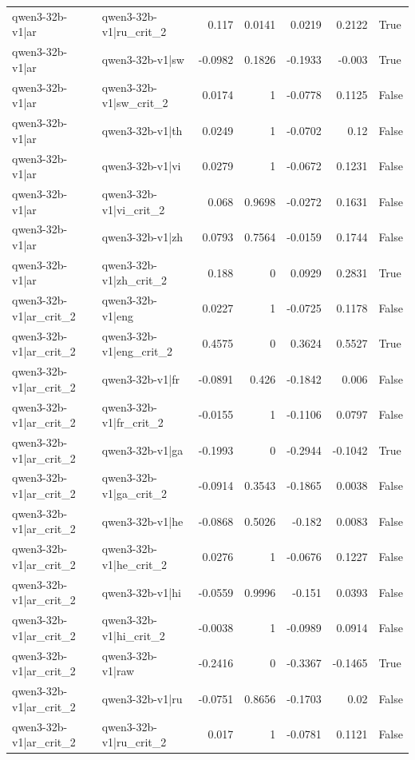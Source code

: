 \begin{table}
\begin{tabular}{l l r r r r l}
qwen3-32b-v1|ar & qwen3-32b-v1|ru_crit_2 & 0.117 & 0.0141 & 0.0219 & 0.2122 & True \\
qwen3-32b-v1|ar & qwen3-32b-v1|sw & -0.0982 & 0.1826 & -0.1933 & -0.003 & True \\
qwen3-32b-v1|ar & qwen3-32b-v1|sw_crit_2 & 0.0174 & 1 & -0.0778 & 0.1125 & False \\
qwen3-32b-v1|ar & qwen3-32b-v1|th & 0.0249 & 1 & -0.0702 & 0.12 & False \\
qwen3-32b-v1|ar & qwen3-32b-v1|vi & 0.0279 & 1 & -0.0672 & 0.1231 & False \\
qwen3-32b-v1|ar & qwen3-32b-v1|vi_crit_2 & 0.068 & 0.9698 & -0.0272 & 0.1631 & False \\
qwen3-32b-v1|ar & qwen3-32b-v1|zh & 0.0793 & 0.7564 & -0.0159 & 0.1744 & False \\
qwen3-32b-v1|ar & qwen3-32b-v1|zh_crit_2 & 0.188 & 0 & 0.0929 & 0.2831 & True \\
qwen3-32b-v1|ar_crit_2 & qwen3-32b-v1|eng & 0.0227 & 1 & -0.0725 & 0.1178 & False \\
qwen3-32b-v1|ar_crit_2 & qwen3-32b-v1|eng_crit_2 & 0.4575 & 0 & 0.3624 & 0.5527 & True \\
qwen3-32b-v1|ar_crit_2 & qwen3-32b-v1|fr & -0.0891 & 0.426 & -0.1842 & 0.006 & False \\
qwen3-32b-v1|ar_crit_2 & qwen3-32b-v1|fr_crit_2 & -0.0155 & 1 & -0.1106 & 0.0797 & False \\
qwen3-32b-v1|ar_crit_2 & qwen3-32b-v1|ga & -0.1993 & 0 & -0.2944 & -0.1042 & True \\
qwen3-32b-v1|ar_crit_2 & qwen3-32b-v1|ga_crit_2 & -0.0914 & 0.3543 & -0.1865 & 0.0038 & False \\
qwen3-32b-v1|ar_crit_2 & qwen3-32b-v1|he & -0.0868 & 0.5026 & -0.182 & 0.0083 & False \\
qwen3-32b-v1|ar_crit_2 & qwen3-32b-v1|he_crit_2 & 0.0276 & 1 & -0.0676 & 0.1227 & False \\
qwen3-32b-v1|ar_crit_2 & qwen3-32b-v1|hi & -0.0559 & 0.9996 & -0.151 & 0.0393 & False \\
qwen3-32b-v1|ar_crit_2 & qwen3-32b-v1|hi_crit_2 & -0.0038 & 1 & -0.0989 & 0.0914 & False \\
qwen3-32b-v1|ar_crit_2 & qwen3-32b-v1|raw & -0.2416 & 0 & -0.3367 & -0.1465 & True \\
qwen3-32b-v1|ar_crit_2 & qwen3-32b-v1|ru & -0.0751 & 0.8656 & -0.1703 & 0.02 & False \\
qwen3-32b-v1|ar_crit_2 & qwen3-32b-v1|ru_crit_2 & 0.017 & 1 & -0.0781 & 0.1121 & False \\

\end{tabular}
\end{table}
